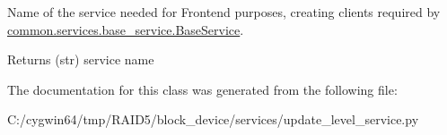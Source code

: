 Name of the service needed for Frontend purposes, creating clients required by \hyperlink{class_r_a_i_d5_1_1common_1_1services_1_1base__service_1_1_base_service}{common.\+services.\+base\+\_\+service.\+Base\+Service}. 

\begin{DoxyReturn}{Returns}
(str) service name 
\end{DoxyReturn}


The documentation for this class was generated from the following file\+:\begin{DoxyCompactItemize}
\item 
C\+:/cygwin64/tmp/\+R\+A\+I\+D5/block\+\_\+device/services/update\+\_\+level\+\_\+service.\+py\end{DoxyCompactItemize}
